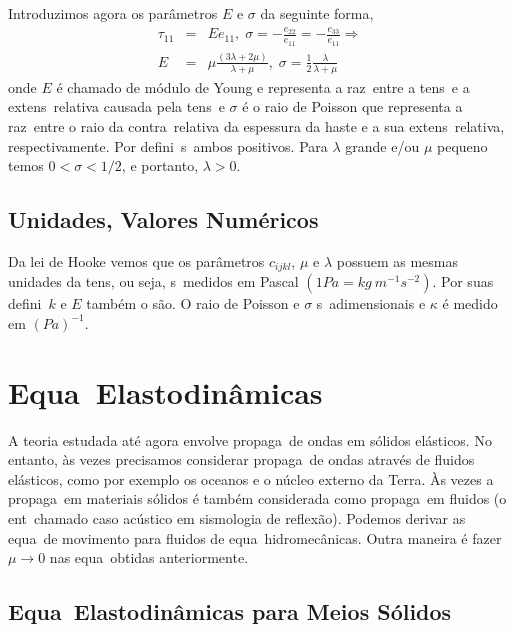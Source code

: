 Introduzimos agora os par\^ametros $E$ e $\sigma$ da seguinte forma,
\begin{eqnarray}
\tau_{11} &=& Ee_{11}, \; \sigma = -\frac{e_{22}}{e_{11}} = -\frac{e_{33}}{e_{11}} \Longrightarrow \nonumber \\
E &=& \mu\frac{(3\lambda + 2\mu)}{\lambda + \mu}, \; \sigma = \frac{1}{2}\frac{\lambda}{\lambda + \mu}
\end{eqnarray}
onde $E$ \'e chamado de m\'odulo de Young e representa a raz\ao\ entre a
tens\ao\ e a extens\ao\ relativa causada pela tens\ao\, e $\sigma$ \'e o
raio de Poisson que representa a raz\ao\ entre o raio da contra\cao\
relativa da espessura da haste e a sua extens\ao\ relativa,
respectivamente. Por defini\cao\ s\ao\ ambos positivos. Para $\lambda$
grande e/ou $\mu$ pequeno temos $0<\sigma<1/2$, e portanto, $\lambda>0$.

\subsection{Unidades, Valores Num\'ericos}

Da lei de Hooke vemos que os par\^ametros $c_{ijkl}$, ${\mu}$ e
${\lambda}$ possuem as mesmas unidades da tens\ao, ou seja, s\ao\
medidos em Pascal $(1Pa = kg\ m^{-1} s^{-2})$. Por suas defini\coes\ $k$ e
$E$ tamb\'em o s\~ao. O raio de Poisson e $\sigma$ s\ao\ adimensionais e
$\kappa$ \'e medido em $(Pa)^{-1}$.

\section{Equa\coes\ Elastodin\^amicas}

A teoria estudada at\'e agora envolve propaga\cao\ de ondas em s\'olidos
el\'asticos. No entanto, \`as vezes precisamos considerar propaga\cao\
de ondas atrav\'es de fluidos el\'asticos, como por exemplo os oceanos e
o n\'ucleo externo da Terra. \`As vezes a propaga\cao\ em materiais
s\'olidos \'e tamb\'em considerada como propaga\cao\ em fluidos (o
ent\ao\ chamado caso ac\'ustico em sismologia de reflex\~ao). Podemos
derivar as equa\coes\ de movimento para fluidos de equa\coes\
hidromec\^anicas. Outra maneira \'e fazer $\mu \longrightarrow 0$ nas
equa\coes\ obtidas anteriormente.

\subsection{Equa\coes\ Elastodin\^amicas para Meios S\'olidos}

